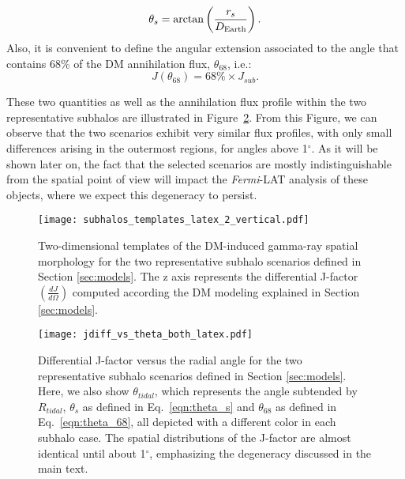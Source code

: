 \documentclass[%
 reprint,
nofootinbib,
 amsmath,amssymb,
 aps,
]{revtex4-2}
\begin{document}
\begin{equation}\label{eqn:theta_s}
\theta_{s} = \arctan\left(\frac{r_{s}}{D_{\rm Earth}}\right).
\end{equation}
Also, it is convenient to define the angular extension associated to the angle that contains 68\% of the DM annihilation flux, $\theta_{68}$, i.e.:
\begin{equation}\label{eqn:theta_68}
J(\theta_{68}) = 68\%\times J_{sub}.
\end{equation}

These two quantities as well as the annihilation flux profile within the two representative subhalos are illustrated in Figure~\ref{fig:degeneracy}. From this Figure, we can observe that the two scenarios exhibit very similar flux profiles, with only small differences arising in the outermost regions, for angles above 1$^\circ$. 
As it will be shown later on, the fact that the selected scenarios are mostly indistinguishable from the spatial point of view will impact the \textit{Fermi}-LAT analysis of these objects, where we expect this degeneracy to persist.

\begin{figure}[!ht]
\centering
\texttt{[image: subhalos\_templates\_latex\_2\_vertical.pdf]}
\caption{Two-dimensional templates of the DM-induced gamma-ray spatial morphology for the two representative subhalo scenarios defined in Section \ref{sec:models}. The z axis represents the differential J-factor $\left(\frac{dJ}{d\Omega}\right)$ computed according the DM modeling explained in Section \ref{sec:models}.}
\label{fig:clumpy_maps}
\end{figure}

\begin{figure}[!ht]
\centering
\texttt{[image: jdiff\_vs\_theta\_both\_latex.pdf]}
\caption{Differential J-factor versus the radial angle for the two representative subhalo scenarios defined in Section \ref{sec:models}. Here, we also show $\theta_{tidal}$, which represents the angle subtended by $R_{tidal}$, $\theta_s$ as defined in Eq.~\ref{eqn:theta_s} and $\theta_{68}$ as defined in Eq.~\ref{eqn:theta_68}, all depicted with a different color in each subhalo case. The spatial distributions of the J-factor are almost identical until about 1$^\circ$, emphasizing the degeneracy discussed in the main text.}
\label{fig:degeneracy}
\end{figure}
\end{document}
